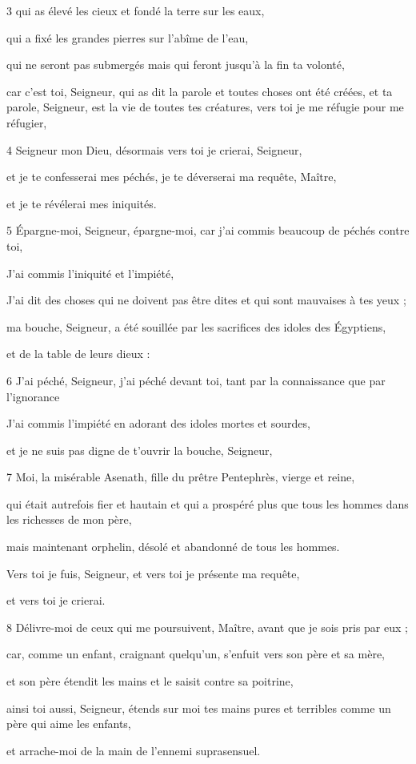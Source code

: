 \par 3 qui as élevé les cieux et fondé la terre sur les eaux,
\par qui a fixé les grandes pierres sur l'abîme de l'eau,
\par qui ne seront pas submergés mais qui feront jusqu'à la fin ta volonté,
\par car c'est toi, Seigneur, qui as dit la parole et toutes choses ont été créées, et ta parole, Seigneur, est la vie de toutes tes créatures, vers toi je me réfugie pour me réfugier,

\par 4 Seigneur mon Dieu, désormais vers toi je crierai, Seigneur,
\par et je te confesserai mes péchés, je te déverserai ma requête, Maître,
\par et je te révélerai mes iniquités.

\par 5 Épargne-moi, Seigneur, épargne-moi, car j'ai commis beaucoup de péchés contre toi,
\par J'ai commis l'iniquité et l'impiété,
\par J'ai dit des choses qui ne doivent pas être dites et qui sont mauvaises à tes yeux ;
\par ma bouche, Seigneur, a été souillée par les sacrifices des idoles des Égyptiens,
\par et de la table de leurs dieux :

\par 6 J'ai péché, Seigneur, j'ai péché devant toi, tant par la connaissance que par l'ignorance
\par J'ai commis l'impiété en adorant des idoles mortes et sourdes,
\par et je ne suis pas digne de t'ouvrir la bouche, Seigneur,

\par 7 Moi, la misérable Asenath, fille du prêtre Pentephrès, vierge et reine,
\par qui était autrefois fier et hautain et qui a prospéré plus que tous les hommes dans les richesses de mon père,
\par mais maintenant orphelin, désolé et abandonné de tous les hommes.
\par Vers toi je fuis, Seigneur, et vers toi je présente ma requête,
\par et vers toi je crierai.

\par 8 Délivre-moi de ceux qui me poursuivent, Maître, avant que je sois pris par eux ;
\par car, comme un enfant, craignant quelqu'un, s'enfuit vers son père et sa mère,
\par et son père étendit les mains et le saisit contre sa poitrine,
\par ainsi toi aussi, Seigneur, étends sur moi tes mains pures et terribles comme un père qui aime les enfants,
\par et arrache-moi de la main de l'ennemi suprasensuel.


